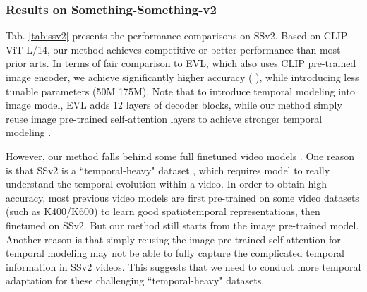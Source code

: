 \documentclass{article} \usepackage{iclr2023_conference,times}
\begin{document}
	\subsubsection{Results on Something-Something-v2}
Tab. \ref{tab:ssv2} presents the performance comparisons on SSv2. 
	Based on CLIP ViT-L/14, our method achieves competitive or better performance than most  prior arts.
	In terms of fair comparison to EVL, which also uses CLIP pre-trained image encoder, we achieve significantly higher accuracy (  ), while introducing  less tunable parameters (50M  175M). 
	Note that to introduce temporal modeling into image model, EVL adds 12 layers of decoder blocks, while our method  simply reuse image pre-trained self-attention layers to achieve stronger temporal modeling . 
	
	However, our method falls behind some full finetuned video models \citep{girdhar2022omnivore,mvitv2,li2021uniformer}. 
	One reason is that SSv2 is a ``temporal-heavy" dataset \citep{sevilla2021only}, which requires model to really understand the temporal evolution within a video.
	In order to obtain high accuracy, most previous video models are first pre-trained on some video datasets (such as K400/K600) to learn good spatiotemporal representations, then finetuned on SSv2. 
	But our method still starts from the image pre-trained model.
	Another reason is that simply reusing the image pre-trained self-attention for temporal modeling may not be able to fully capture the complicated temporal information in SSv2 videos. 
	This suggests that we need to conduct more temporal adaptation for these challenging ``temporal-heavy" datasets.
	
	
	
\end{document}
